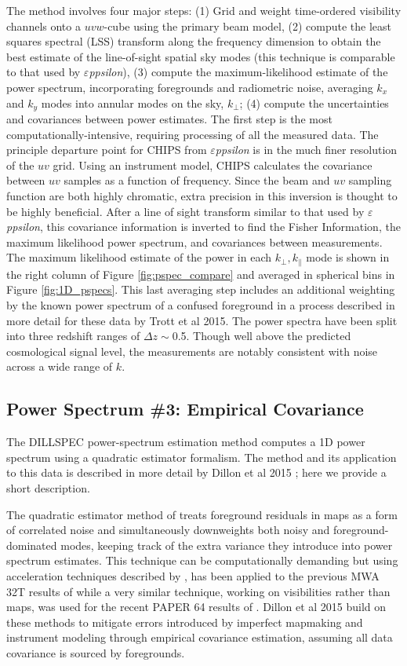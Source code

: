 \documentclass[twolcolumn,iop]{emulateapj}
\def\eppsilon{{\it $\varepsilon$ppsilon}}
\def\empirical{DILLSPEC}
\def\chipscite{Trott et al 2015}
\def\dilloncite{Dillon et al 2015 }
\begin{document}
The method involves four major steps: (1) Grid and weight time-ordered visibility channels onto a $uvw$-cube using the primary beam model, (2) compute the least squares spectral (LSS) transform along the frequency dimension to obtain the best estimate of the line-of-sight spatial sky modes (this technique is comparable to that used by \eppsilon), (3) compute the maximum-likelihood estimate of the power spectrum, incorporating foregrounds and radiometric noise,  averaging $k_x$ and $k_y$ modes into annular modes on the sky, $k_\bot$; (4) compute the uncertainties and covariances between power estimates. The first step is the most computationally-intensive, requiring processing of all the measured data. The principle departure point for CHIPS from \eppsilon{} is in the much finer resolution of the $uv$ grid.  Using an instrument model, CHIPS calculates the covariance between $uv$ samples as a function of frequency.  Since the beam and $uv$ sampling function are both highly chromatic, extra precision in this inversion is thought to be highly beneficial. After a line of sight transform similar to that used by \eppsilon{}, this covariance information is inverted to find the Fisher Information, the maximum likelihood power spectrum, and covariances between measurements.  The maximum likelihood estimate of the power in each $k_\bot,k_\parallel$ mode is shown in the right column of Figure \ref{fig:pspec_compare} and averaged in spherical bins in Figure \ref{fig:1D_pspecs}. This last averaging step includes an additional weighting by the known power spectrum of a confused foreground in a process described in more detail for these data by \chipscite{}. The power spectra have been split into three redshift ranges of $\Delta z\sim$0.5. Though well above the predicted cosmological signal level, the measurements are notably consistent with noise across a wide range of $k$. 

\subsection{Power Spectrum \#3: Empirical Covariance}
\label{sec:empirical_cov}

The \empirical{} power-spectrum estimation method computes a 1D power spectrum using a quadratic estimator formalism. The method and its application to this data is described in more detail by \dilloncite{}; here we provide a short description.

The quadratic estimator method of \cite{Liu:2011p8763} treats foreground residuals in maps as a form of correlated noise and simultaneously downweights both noisy and foreground-dominated modes, keeping track of the extra variance they introduce into power spectrum estimates. This technique can be computationally demanding but using acceleration techniques described by \cite{Dillon:2013p10497}, has been applied to the previous MWA 32T results of \cite{Dillon:2014p9788} while a very similar technique, working on visibilities rather than maps, was used for the recent PAPER 64 results of \cite{2015ApJ...809...61A}.  \dilloncite{} build on these methods to mitigate errors introduced by imperfect mapmaking and instrument modeling through empirical covariance estimation, assuming all data covariance is sourced by foregrounds.
\end{document}

